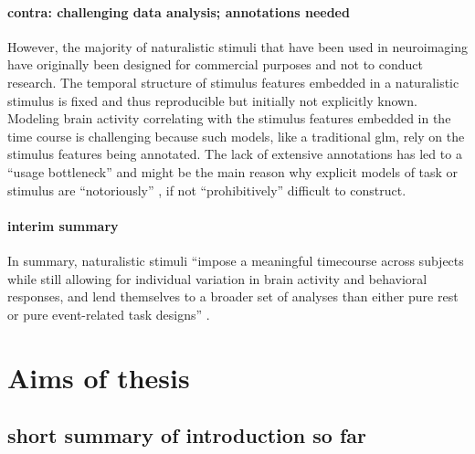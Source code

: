 \paragraph{contra: challenging data analysis; annotations needed}

%
However, the majority of naturalistic stimuli that have been used in
neuroimaging have originally been designed for commercial purposes and not to
conduct research.
%
The temporal structure of stimulus features embedded in a naturalistic stimulus
is fixed and thus reproducible but initially not explicitly known.
%
Modeling brain activity correlating with the stimulus features embedded in the
time course is challenging \citep{saarimaki2021naturalistic, simony2020analysis}
because such models, like a traditional \ac{glm}, rely on the stimulus features
being annotated.
%
The lack of extensive annotations has led to a ``usage bottleneck''
\citep{aliko2020naturalistic} and might be the main reason why explicit models
of task or stimulus are ``notoriously'' \citep{richard2019fast}, if not
``prohibitively'' \citep{nastase2019measuring} difficult to construct.



\paragraph{interim summary}

In summary, naturalistic stimuli ``impose a meaningful timecourse across
subjects while still allowing for individual variation in brain activity and
behavioral responses, and lend themselves to a broader set of analyses than
either pure rest or pure event-related task designs'' \citep{finn2017can}.


\section{Aims of thesis}


\subsection{short summary of introduction so far}


